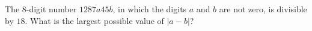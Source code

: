 The $8$-digit number $\overline{1287a45b}$, in which the digits $a$ and $b$ are not zero, is divisible by $18$. What is the largest possible value of $|a-b|$?
